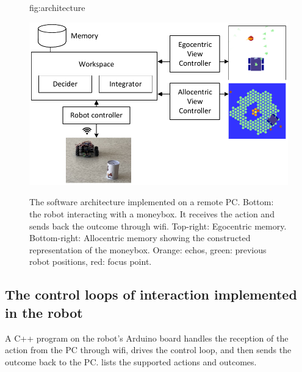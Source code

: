 \documentclass[pmlr]{jmlr}%
\begin{document}
\begin{figure}[htbp]
	\floatconts
	{fig:architecture}
	{\caption{The software architecture implemented on a remote PC. 
			Bottom: the robot interacting with a moneybox. 
			It receives the action and sends back the outcome through wifi.
			Top-right: Egocentric memory.
			Bottom-right: Allocentric memory showing the constructed representation of the moneybox.
			Orange: echos, green: previous robot positions, red: focus point.}}
	{\includegraphics[width=0.8\linewidth]{images/Figure_2_Architecture}}
\end{figure}


\subsection{The control loops of interaction implemented in the robot}
\label{moves}

A C++ program on the robot's Arduino board handles the reception of the action from the PC through wifi, drives the control loop, and then sends the outcome back to the PC. 
 lists the supported actions and outcomes.
\end{document}
